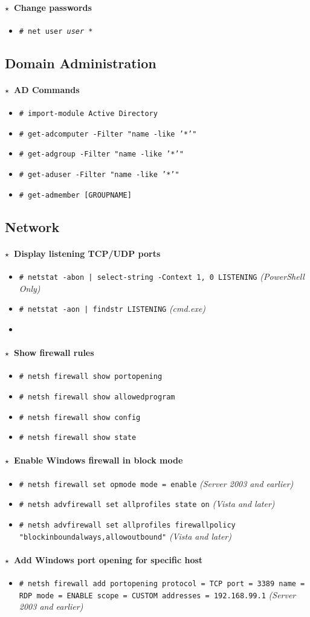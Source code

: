 \documentclass[10pt,landscape]{article}
\newcommand{\os}[1]{\texttt{\footnotesize{#1}}}
\newcommand{\windows}{\os{W}}
\newenvironment{action}[1]
  {\paragraph{$\star$~#1}\begin{itemize}[leftmargin=1cm]}
  {\end{itemize}}
\newcommand{\cmd}[2]{\item[#1] {\small\tt\# #2}}
\newcommand{\tool}[2]{\item[#1] {\footnotesize\sc{#2}}\xspace}
\begin{document}
\begin{multicols*}{3}
\begin{action}{Change passwords}
\cmd{\windows}{net user \emph{user} *}
\end{action}

\subsection*{Domain Administration}
\begin{action}{AD Commands}
\cmd{\windows}{import-module Active Directory}
\cmd{\windows}{get-adcomputer -Filter "name -like '*'"}
\cmd{\windows}{get-adgroup -Filter "name -like '*'"}
\cmd{\windows}{get-aduser -Filter "name -like '*'"}
\cmd{\windows}{get-admember  [GROUPNAME]}
\end{action}

\subsection*{Network}

\begin{action}{Display listening TCP/UDP ports}
\cmd{\windows}{netstat -abon | select-string -Context 1, 0 LISTENING} \emph{(PowerShell Only)}
\cmd{\windows}{netstat -aon | findstr LISTENING} \emph{(cmd.exe)}
\tool{\windows}{tcpview}
\end{action}

\begin{action}{Show firewall rules}
\cmd{\windows}{netsh firewall show portopening}
\cmd{\windows}{netsh firewall show allowedprogram}
\cmd{\windows}{netsh firewall show config}
\cmd{\windows}{netsh firewall show state}
\end{action}

\begin{action}{Enable Windows firewall in block mode}
    \cmd{\windows}{netsh firewall set opmode mode = enable} \emph{(Server 2003 and earlier)}
    \cmd{\windows}{netsh advfirewall set allprofiles state on} \emph{(Vista and later)}
    \cmd{\windows}{netsh advfirewall set allprofiles firewallpolicy "blockinboundalways,allowoutbound"} \emph{(Vista and later)}
\end{action}

\begin{action}{Add Windows port opening for specific host}
\cmd{\windows}{netsh firewall add portopening protocol = TCP port = 3389 name = RDP mode = ENABLE scope = CUSTOM addresses = 192.168.99.1} \emph{(Server 2003 and earlier)}
\end{action}


\end{multicols*}
\end{document}

